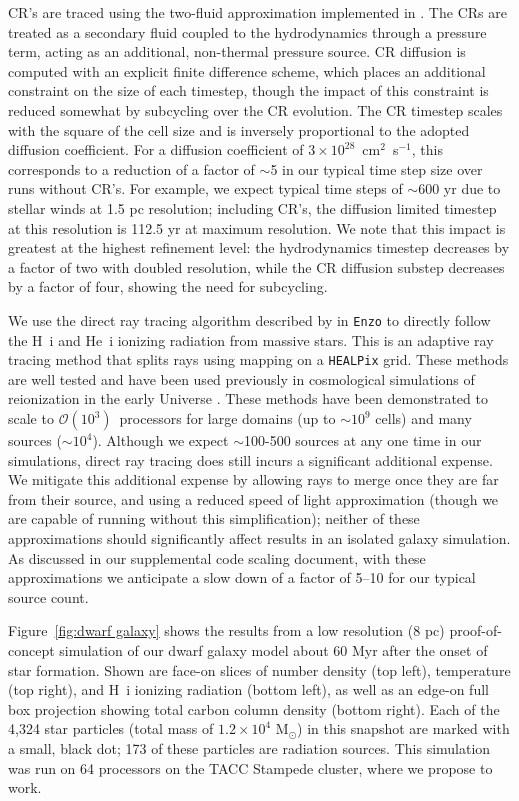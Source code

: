\documentclass[11pt]{article}
\begin{document}
CR's are traced using the two-fluid approximation implemented in \cite{SalemBryan2014}. The CRs are treated as a secondary fluid coupled to the hydrodynamics through a pressure term, acting as an additional, non-thermal pressure source. CR diffusion is computed with an explicit finite difference scheme, which places an additional constraint on the size of each timestep, though the impact of this constraint is reduced somewhat by subcycling over the CR evolution. The CR timestep scales with the square of the cell size and is inversely proportional to the adopted diffusion coefficient. For a diffusion coefficient of $3\times10^{28}$~cm$^{2}$~s$^{-1}$, this corresponds to a reduction of a factor of $\sim$5 in our typical time step size over runs without CR's. For example, we expect typical time steps of $\sim$600 yr due to stellar winds at 1.5 pc resolution; including CR's, the diffusion limited timestep at this resolution is 112.5 yr at maximum resolution. We note that this impact is greatest at the highest refinement level: the hydrodynamics timestep decreases by a factor of two with doubled resolution, while the CR diffusion substep decreases by a factor of four, showing the need for subcycling.

We use the direct ray tracing algorithm described by \cite{WiseAbel2011} in \texttt{Enzo} to directly follow the H~{\sc i} and He~{\sc i} ionizing radiation from massive stars. This is an adaptive ray tracing method that splits rays using mapping on a \texttt{HEALPix} grid. These methods are well tested and have been used previously in cosmological simulations of reionization in the early Universe \citep{Wise2012a, WiseAbel2012,Wise2014, Kim2013a, Kim2013b}. These methods have been demonstrated to scale to $\mathcal{O}(10^{3})$~processors for large domains (up to $\sim 10^9$ cells) and many sources ($\sim10^{4}$). Although we expect $\sim$100-500 sources at any one time in our simulations, direct ray tracing does still incurs a significant additional expense. We mitigate this additional expense by allowing rays to merge once they are far from their source, and using a reduced speed of light approximation (though we are capable of running without this simplification); neither of these approximations should significantly affect results in an isolated galaxy simulation. As discussed in our supplemental code scaling document, with these approximations we anticipate a slow down of a factor of 5--10 for our typical source count.

Figure~\ref{fig:dwarf galaxy} shows the results from a low resolution (8 pc) proof-of-concept simulation of our dwarf galaxy model about 60 Myr after the onset of star formation. Shown are face-on slices of number density (top left), temperature (top right), and H~{\sc i} ionizing radiation (bottom left), as well as an edge-on full box projection showing total carbon column density (bottom right). Each of the 4,324 star particles (total mass of $1.2\times10^4$ M$_{\odot}$) in this snapshot are marked with a small, black dot; 173 of these particles are radiation sources. This simulation was run on 64 processors on the TACC Stampede cluster, where we propose to work.
\end{document}
